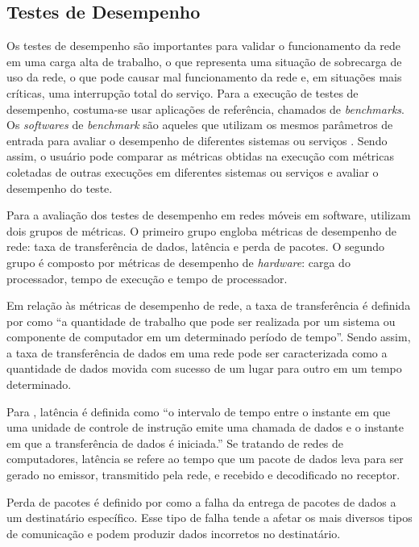 \subsection{Testes de Desempenho}

Os testes de desempenho são importantes para validar o funcionamento da rede em uma carga alta de trabalho, o que representa uma situação de sobrecarga de uso da rede, o que pode causar mal funcionamento da rede e, em situações mais críticas, uma interrupção total do serviço.
Para a execução de testes de desempenho, costuma-se usar aplicações de referência, chamados de \textit{benchmarks}.
Os \textit{softwares} de \textit{benchmark} são aqueles que utilizam os mesmos parâmetros de entrada para avaliar o desempenho de diferentes sistemas ou serviços \cite{Boano2018}.
Sendo assim, o usuário pode comparar as métricas obtidas na execução com métricas coletadas de outras execuções em diferentes sistemas ou serviços e avaliar o desempenho do teste.

Para a avaliação dos testes de desempenho em redes móveis em software,  utilizam dois grupos de métricas.
O primeiro grupo engloba métricas de desempenho de rede: taxa de transferência de dados, latência e perda de pacotes.
O segundo grupo é composto por métricas de desempenho de \textit{hardware}: carga do processador, tempo de execução e tempo de processador.

Em relação às métricas de desempenho de rede, a taxa de transferência é definida por  como ``a quantidade de trabalho que pode ser realizada por um sistema ou componente de computador em um determinado período de tempo''.
Sendo assim, a taxa de transferência de dados em uma rede pode ser caracterizada como a quantidade de dados movida com sucesso de um lugar para outro em um tempo determinado.

Para , latência é definida como ``o intervalo de tempo entre o instante em que uma unidade de controle de instrução emite uma chamada de dados e o instante em que a transferência de dados é iniciada.'' Se tratando de redes de computadores, latência se refere ao tempo que um pacote de dados leva para ser gerado no emissor, transmitido pela rede, e recebido e decodificado no receptor.

Perda de pacotes é definido por  como a falha da entrega de pacotes de dados a um destinatário específico. Esse tipo de falha tende a afetar os mais diversos tipos de comunicação e podem produzir dados incorretos no destinatário.

